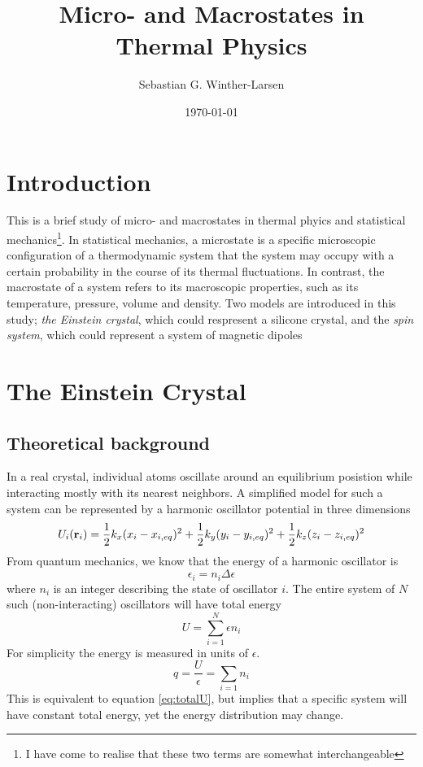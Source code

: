 \documentclass[10pt,a4paper]{amsart}
\title[Micro and Macrostates in Thermal Physics]{Micro- and Macrostates in Thermal Physics \\
	\hrulefill\fbox{FYS2160}\hrulefill}
\author[Winther-Larsen]{Sebastian G. Winther-Larsen}
\date{\today}
\begin{document}
\maketitle

\tableofcontents

\section{Introduction}
This is a brief study of micro- and macrostates in thermal phyics and statistical mechanics\footnote{I have come to realise that these two terms are somewhat interchangeable}. In statistical mechanics, a microstate is a specific microscopic configuration of a thermodynamic system that the system may occupy with a certain probability in the course of its thermal fluctuations. In contrast, the macrostate of a system refers to its macroscopic properties, such as its temperature, pressure, volume and density. Two models are introduced in this study; \emph{the Einstein crystal}, which could respresent a silicone crystal, and the \emph{spin system}, which could represent a system of magnetic dipoles

\section{The Einstein Crystal}

\subsection{Theoretical background}
In a real crystal, individual atoms oscillate around an equilibrium posistion while interacting mostly with its nearest neighbors. A simplified model for such a system can be represented by a harmonic oscillator potential in three dimensions
\begin{equation}
U_i(\vb{r}_i)=\frac{1}{2}k_x(x_i-x_{i,eq})^2+\frac{1}{2}k_y(y_i-y_{i,eq})^2+\frac{1}{2}k_z(z_i-z_{i,eq})^2
\end{equation} 
From quantum mechanics, we know that the energy of a harmonic oscillator is
\begin{equation}
\epsilon_i=n_i\Delta \epsilon
\end{equation}
where $n_i$ is an integer describing the state of oscillator $i$. The entire system of $N$ such (non-interacting) oscillators will have total energy
\begin{equation}
\label{eq:totalU}
U=\sum_{i=1}^N \epsilon n_i
\end{equation}
For simplicity the energy is measured in units of $\epsilon$.
\begin{equation}
q = \frac{U}{\epsilon}=\sum_{i=1} n_i
\end{equation}
This is equivalent to equation \ref{eq:totalU}, but implies that a specific system will have constant total energy, yet the energy distribution may change.
\end{document}
